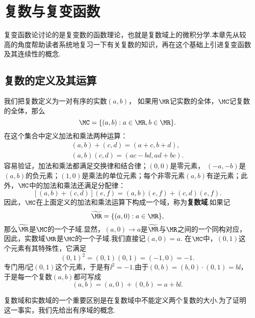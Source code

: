 \chapter{复数与复变函数\label{chap1}}
复变函数论讨论的是复变数的函数理论，也就是复数域上的微积分学.本章先从较高的角度帮助读者系统地复习一下有关复数的知识，再在这个基础上引进复变函数及其连续性的概念.

\section{复数的定义及其运算\label{sec1.1}}
我们把复数定义为一对有序的实数$(a,b)$， 如果用$\MR$记实数的全体，$\MC$记复数的全体，那么
\[\MC=\{(a,b):a\in\MR,b\in\MR\}.\]
在这个集合中定义加法和乘法两种运算：
\begin{gather*}
(a,b)+(c,d)=(a+c,b+d),\\
(a,b)(c,d)=(ac-bd,ad+bc).
\end{gather*}
容易验证，加法和乘法都满足交换律和结合律；$(0,0)$是零元素，
$(-a,-b)$是$(a,b)$的负元素；$(1,0)$是乘法的单位元素；每个非零元素$(a,b)$有逆元素；此外，$\MC$中的加法和乘法还满足分配律：
\[[(a,b)+(c,d)](e,f)=(a,b)(e,f)+(c,d)(e,f).\]
因此，$\MC$在上面定义的加法和乘法运算下构成一个域，称为\textbf{复数域}.如果记
\[\widetilde{\MR}=\{(a,0):a\in\MR\},\]
那么$\widetilde{\MR}$是$\MC$的一个子域.显然，$(a,0)\to a$是$\widetilde{\MR}$与$\MR$之间的一个同构对应，因此，实数域$\MR$是$\MC$的一个子域.我们直接记$(a,0)=a$. 在$\MC$中，$(0,1)$这个元素有其特殊性，它满足
\[(0,1)^2=(0,1)(0,1)=(-1,0)=-1.\]
专门用$\ii$记$(0,1)$这个元素，于是有$\ii^2=-1$.由于$(0,b)=(b,0)\cdot(0,1)=b\ii$，于是每一个复数$(a,b)$都可写成
\[(a,b)=(a,0)+(0,b)=a+b\ii.\]

复数域和实数域的一个重要区别是在复数域中不能定义两个复数的大小.为了证明这一事实，我们先给出有序域的概念.

